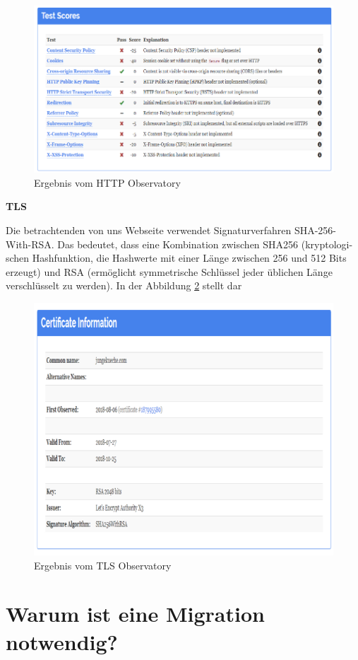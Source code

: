 \begin{figure}[h]
	\centering
	\includegraphics[width=0.8\linewidth]{Graphics/eergebnisobser.png}
	\caption[Egebniss vom HTTP Observatory]{ Ergebnis vom HTTP Observatory }
	\label{fig: HTTP Observatory: Ergebnis}
\end{figure}

\textbf{TLS}

Die betrachtenden von uns Webseite verwendet Signaturverfahren SHA-256-With-RSA. Das bedeutet, dass eine Kombination zwischen SHA256 (kryptologi-schen Hashfunktion, die Hashwerte mit einer Länge zwischen 256 und 512 Bits erzeugt) und \ac{RSA} (ermöglicht symmetrische Schlüssel jeder üblichen Länge verschlüsselt zu werden). In der Abbildung \ref{fig: TSL Observatory: Ergebnis} stellt dar

\begin{figure}[h]
	\centering
	\includegraphics[width=0.8\linewidth]{Graphics/obser2.png}
	\caption[Egebniss TSL Observatory]{Ergebnis vom TLS Observatory}
	\label{fig: TSL Observatory: Ergebnis}
\end{figure}

\section{Warum ist eine Migration notwendig?}

